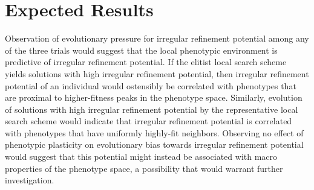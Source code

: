 \section{Expected Results}
Observation of evolutionary pressure for irregular refinement potential among any of the three trials would suggest that the local phenotypic environment is predictive of irregular refinement potential. If the elitist local search scheme yields solutions with high irregular refinement potential, then irregular refinement potential of an individual would ostensibly be correlated with phenotypes that are proximal to higher-fitness peaks in the phenotype space. Similarly, evolution of solutions with high irregular refinement potential by the representative local search scheme would indicate that irregular refinement potential is correlated with phenotypes that have uniformly highly-fit neighbors. Observing no effect of phenotypic plasticity on evolutionary bias towards irregular refinement potential would suggest that this potential might instead be associated with macro properties of the phenotype space, a possibility that would warrant further investigation.